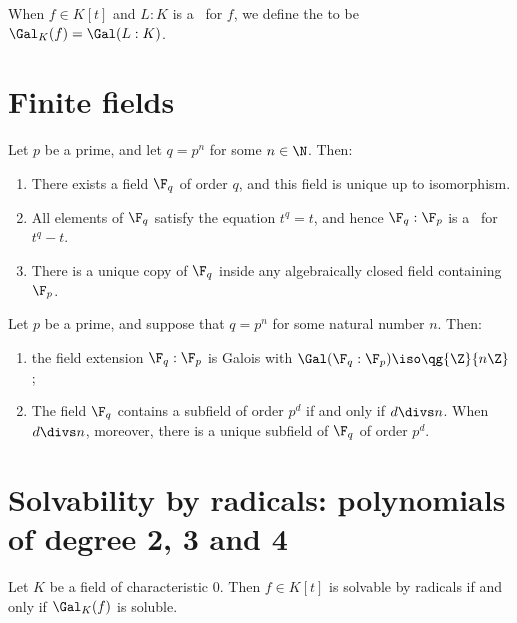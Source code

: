 \documentclass{article}
\begin{document}
  \begin{tdefinition}
    When \( f\in K[t] \) and \( L:K \) is a \sfe~for \( f \), we define the  to be \( \Gal_K(f) = \Gal(L:K) \).
  \end{tdefinition}

\section{Finite fields}
  \begin{ttheorem}
    Let \( p \) be a prime, and let \( q=p^n \) for some \( n\in \N \). Then:
    \begin{enumerate}[label=(\alph*)]
      \item There exists a field \( \F_q \) of order \( q \), and this field is unique up to isomorphism.
      \item All elements of \( \F_q \) satisfy the equation \( t^q=t \), and hence \( \F_q:\F_p \) is a \sfe~for \( t^q-t \).
      \item There is a unique copy of \( \F_q \) inside any algebraically closed field containing \( \F_p \).
    \end{enumerate}
  \end{ttheorem}

  \begin{ttheorem}
    Let \( p \) be a prime, and suppose that \( q=p^n \) for some natural number \( n \). Then:
    \begin{enumerate}[label=(\alph*)]
      \item the field extension \( \F_q:\F_p \) is Galois with \( \Gal(\F_q:\F_p)\iso \qg{\Z}{n\Z} \);
      \item The field \( \F_q \) contains a subfield of order \( p^d \) if and only if \( d\divs n \). When \( d\divs n \), moreover, there is a unique subfield of \( \F_q \) of order \( p^d \).
    \end{enumerate}
  \end{ttheorem}

\section{Solvability by radicals: polynomials of degree 2, 3 and 4}
  \begin{ttheorem}
    Let \( K \) be a field of characteristic 0. Then \( f\in K[t] \) is solvable by radicals if and only if \( \Gal_K(f) \) is soluble.
  \end{ttheorem}
\end{document}
